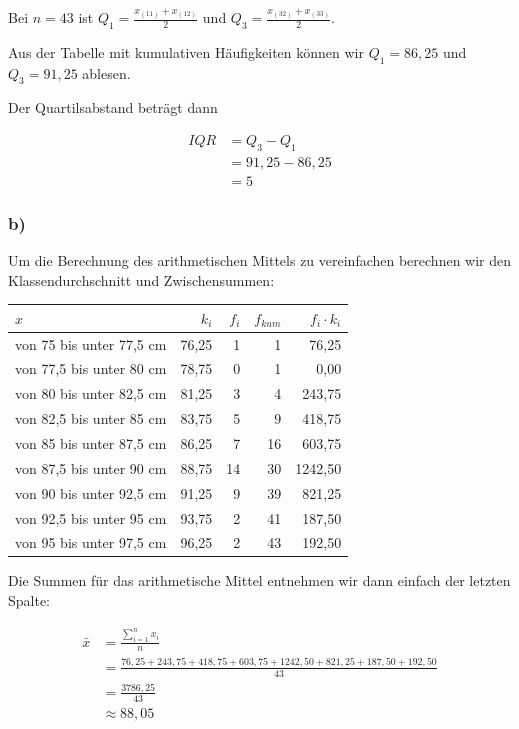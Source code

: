 \documentclass[
  11pt,
  ngerman,
  a4paper,
]{report}
\begin{document}
Bei \(n=43\) ist \(Q_1=\frac{x_{(11)}+x_{(12)}}{2}\) und \(Q_3=\frac{x_{(32)}+x_{(33)}}{2}\).

Aus der Tabelle mit kumulativen Häufigkeiten können wir \(Q_1=86{,}25\) und \(Q_3=91{,}25\) ablesen.

Der Quartilsabstand beträgt dann

\[\begin{aligned}
\mathit{IQR}&=Q_3-Q_1\\
            &=91{,}25-86{,}25\\
            &=5
\end{aligned}\]

\hypertarget{b-5}{%
\subsubsection{b)}\label{b-5}}

Um die Berechnung des arithmetischen Mittels zu vereinfachen berechnen wir den Klassendurchschnitt und Zwischensummen:

\begin{table}[H]
\centering
\begin{tabular}{lrrrr}
\toprule
\textbf{$x$} & \textbf{$k_i$} & \textbf{$f_i$} & \textbf{$f_{kum}$} & \textbf{$f_i \cdot k_i$}\\
\midrule
von 75 bis unter 77,5 cm & 76,25 & 1 & 1 & 76,25\\
von 77,5 bis unter 80 cm & 78,75 & 0 & 1 & 0,00\\
von 80 bis unter 82,5 cm & 81,25 & 3 & 4 & 243,75\\
von 82,5 bis unter 85 cm & 83,75 & 5 & 9 & 418,75\\
von 85 bis unter 87,5 cm & 86,25 & 7 & 16 & 603,75\\
von 87,5 bis unter 90 cm & 88,75 & 14 & 30 & 1242,50\\
von 90 bis unter 92,5 cm & 91,25 & 9 & 39 & 821,25\\
von 92,5 bis unter 95 cm & 93,75 & 2 & 41 & 187,50\\
von 95 bis unter 97,5 cm & 96,25 & 2 & 43 & 192,50\\
\bottomrule
\end{tabular}
\end{table}

Die Summen für das arithmetische Mittel entnehmen wir dann einfach der letzten Spalte:

\[\begin{aligned}
  \bar{x}&=\frac{\sum\limits_{i=1}^nx_i}{n} \\
         &=\frac{76{,}25+ 243{,}75+ 418{,}75+ 603{,}75+1242{,}50+ 821{,}25+ 187{,}50+ 192{,}50}{43} \\
         &=\frac{3786{,}25}{43} \\
         &\approx88{,}05
\end{aligned}\]
\end{document}
